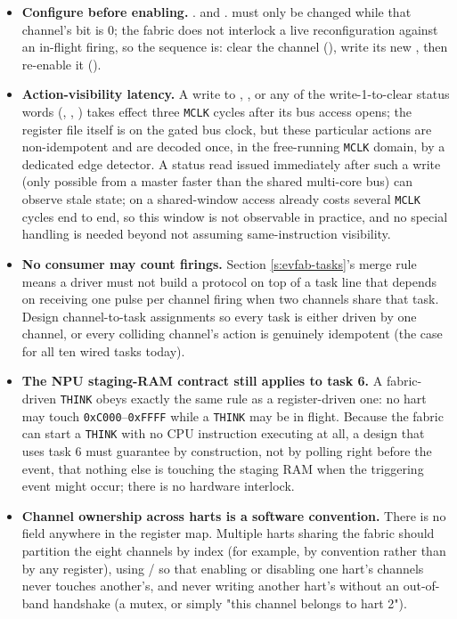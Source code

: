 \begin{itemize}
	\item \textbf{Configure before enabling.} . and . must only be changed while that channel's  bit is 0; the fabric does not interlock a live reconfiguration against an in-flight firing, so the sequence is: clear the channel (), write its new , then re-enable it ().
	\item \textbf{Action-visibility latency.} A write to , , or any of the write-1-to-clear status words (, , ) takes effect three \texttt{MCLK} cycles after its bus access opens; the register file itself is on the gated bus clock, but these particular actions are non-idempotent and are decoded once, in the free-running \texttt{MCLK} domain, by a dedicated edge detector. A status read issued immediately after such a write (only possible from a master faster than the shared multi-core bus) can observe stale state; on \AsicNameForUserGuide{} a shared-window access already costs several \texttt{MCLK} cycles end to end, so this window is not observable in practice, and no special handling is needed beyond not assuming same-instruction visibility.
	\item \textbf{No consumer may count firings.} Section \ref{s:evfab-tasks}'s merge rule means a driver must not build a protocol on top of a task line that depends on receiving one pulse per channel firing when two channels share that task. Design channel-to-task assignments so every task is either driven by one channel, or every colliding channel's action is genuinely idempotent (the case for all ten wired tasks today).
	\item \textbf{The NPU staging-RAM contract still applies to task 6.} A fabric-driven  \texttt{THINK} obeys exactly the same rule as a register-driven one: no hart may touch \texttt{0xC000}--\texttt{0xFFFF} while a \texttt{THINK} may be in flight. Because the fabric can start a \texttt{THINK} with no CPU instruction executing at all, a design that uses task 6 must guarantee by construction, not by polling right before the event, that nothing else is touching the staging RAM when the triggering event might occur; there is no hardware interlock.
	\item \textbf{Channel ownership across harts is a software convention.} There is no  field anywhere in the register map. Multiple harts sharing the fabric should partition the eight channels by index (for example, by convention rather than by any register), using / so that enabling or disabling one hart's channels never touches another's, and never writing another hart's  without an out-of-band handshake (a mutex, or simply "this channel belongs to hart 2").
\end{itemize}

